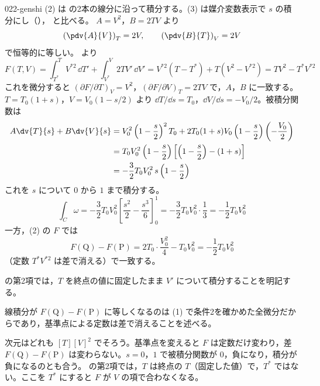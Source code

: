 \documentclass[uplatex,dvipdfmx,a4paper,11pt]{jsarticle}
\begin{document}
\begin{kaisetsu}{022-genshi}
\houshin (2) は  の2本の線分に沿って積分する。(3) は媒介変数表示で $s$ の積分にし（）， と比べる。
\keisan {} $A = V^{2}$，$B = 2TV$ より
\[ \left(\pdv{A}{V}\right)_{T} = 2V, \qquad \left(\pdv{B}{T}\right)_{V} = 2V \]
で恒等的に等しい。
  より
\[ F(T,V) = \int_{T^{*}}^{T} V^{*2}\,\dd T' + \int_{V^{*}}^{V} 2TV'\,\dd V' = V^{*2}(T - T^{*}) + T(V^{2} - V^{*2}) = TV^{2} - T^{*}V^{*2} \]
これを微分すると $(\partial F/\partial T)_{V} = V^{2}$，$(\partial F/\partial V)_{T} = 2TV$ で，$A$，$B$ に一致する。
 $T = T_{0}(1+s)$，$V = V_{0}(1 - s/2)$ より $\dd T/\dd s = T_{0}$，$\dd V/\dd s = -V_{0}/2$。被積分関数は
\begin{align*}
A\dv{T}{s} + B\dv{V}{s} &= V_{0}^{2}\left(1 - \frac{s}{2}\right)^{2}T_{0} + 2T_{0}(1+s)V_{0}\left(1 - \frac{s}{2}\right)\left(-\frac{V_{0}}{2}\right)\\
&= T_{0}V_{0}^{2}\left(1 - \frac{s}{2}\right)\left[\left(1 - \frac{s}{2}\right) - (1+s)\right]\\
&= -\frac{3}{2}T_{0}V_{0}^{2}\,s\left(1 - \frac{s}{2}\right)
\end{align*}
これを $s$ について $0$ から $1$ まで積分する。
\[ \int_{C}\omega = -\frac{3}{2}T_{0}V_{0}^{2}\left[\frac{s^{2}}{2} - \frac{s^{3}}{6}\right]_{0}^{1} = -\frac{3}{2}T_{0}V_{0}^{2}\cdot\frac{1}{3} = -\frac{1}{2}T_{0}V_{0}^{2} \]
一方，(2) の $F$ では
\[ F(\mathrm{Q}) - F(\mathrm{P}) = 2T_{0}\cdot\frac{V_{0}^{2}}{4} - T_{0}V_{0}^{2} = -\frac{1}{2}T_{0}V_{0}^{2} \]
（定数 $T^{*}V^{*2}$ は差で消える）で一致する。
\begin{ronten}
  \item {}  の第2項では，$T$ を終点の値に固定したまま $V'$ について積分することを明記する。
  \item {} 線積分が $F(\mathrm{Q}) - F(\mathrm{P})$ に等しくなるのは (1) で条件2を確かめた全微分だからであり，基準点による定数は差で消えることを述べる。
\end{ronten}
\kenzan 次元はどれも $[T][V]^{2}$ でそろう。基準点を変えると $F$ は定数だけ変わり，差 $F(\mathrm{Q}) - F(\mathrm{P})$ は変わらない。$s = 0$，$1$ で被積分関数が $0$，負になり，積分が負になるのとも合う。
\tsumazuki {} の第2項では，$T$ は終点の $T$（固定した値）で，$T^{*}$ ではない。ここを $T^{*}$ にすると $F$ が $V$ の項で合わなくなる。
\end{kaisetsu}
\end{document}
